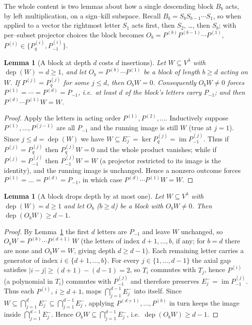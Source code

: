 \documentclass[11pt]{article}
\newtheorem{lemma}[theorem]{Lemma}
\theoremstyle{definition}
\DeclareMathOperator{\im}{im}
\DeclareMathOperator{\dep}{dep}
\newcommand{\Vlam}{V^\lambda}
\newcommand{\Em}[1]{E^{-}_{#1}}
\newcommand{\Pq}{P_{q}}
\newcommand{\Pm}{P_{-1}}
\begin{document}
The whole content is two lemmas about how a single descending block $B_b$ acts, by
left multiplication, on a sign--kill subspace. Recall $B_b=S_bS_{b-1}\cdots S_1$, so when applied
to a vector the rightmost letter $S_1$ acts first, then $S_2$, \dots, then $S_b$; with
per--subset projector choices the block becomes $O_b=P^{(b)}P^{(b-1)}\cdots P^{(1)}$,
$P^{(i)}\in\{\Pq^{(i)},\Pm^{(i)}\}$.

\begin{lemma}[A block at depth $d$ costs $d$ insertions]\label{lem:cost}
Let $W\subseteq\Vlam$ with $\dep(W)=d\ge1$, and let $O_b=P^{(b)}\cdots P^{(1)}$ be a block of
length $b\ge d$ acting on $W$. If $P^{(j)}=\Pq^{(j)}$ for some $j\le d$, then $O_bW=0$.
Consequently $O_bW\neq0$ forces $P^{(1)}=\cdots=P^{(d)}=\Pm$, i.e.\ at least $d$ of the block's
letters carry $\Pm$; and then $P^{(d)}\cdots P^{(1)}W=W$.
\end{lemma}

\begin{proof}
Apply the letters in acting order $P^{(1)},P^{(2)},\dots$. Inductively suppose
$P^{(1)},\dots,P^{(j-1)}$ are all $\Pm$ and the running image is still $W$ (true at $j=1$).
Since $j\le d=\dep(W)$ we have $W\subseteq\Em j=\ker\Pq^{(j)}=\im\Pm^{(j)}$. Thus if
$P^{(j)}=\Pq^{(j)}$ then $\Pq^{(j)}W=0$ and the whole product vanishes; while if
$P^{(j)}=\Pm^{(j)}$ then $\Pm^{(j)}W=W$ (a projector restricted to its image is the identity),
and the running image is unchanged. Hence a nonzero outcome forces $P^{(1)}=\dots=P^{(d)}=\Pm$,
in which case $P^{(d)}\cdots P^{(1)}W=W$.
\end{proof}

\begin{lemma}[A block drops depth by at most one]\label{lem:drop}
Let $W\subseteq\Vlam$ with $\dep(W)=d\ge1$ and let $O_b$ ($b\ge d$) be a block with
$O_bW\neq0$. Then $\dep(O_bW)\ge d-1$.
\end{lemma}

\begin{proof}
By Lemma~\ref{lem:cost} the first $d$ letters are $\Pm$ and leave $W$ unchanged, so
$O_bW=P^{(b)}\cdots P^{(d+1)}\,W$ (the letters of index $d+1,\dots,b$, if any; for $b=d$ there are
none and $O_bW=W$, giving depth $d\ge d-1$). Each remaining letter carries a generator of index
$i\in\{d+1,\dots,b\}$. For every $j\in\{1,\dots,d-1\}$ the axial gap satisfies
$|i-j|\ge(d+1)-(d-1)=2$, so $T_i$ commutes with $T_j$, hence $P^{(i)}$ (a polynomial in $T_i$)
commutes with $\Pm^{(j)}$ and therefore preserves $\Em j=\im\Pm^{(j)}$. Thus each $P^{(i)}$,
$i\ge d+1$, maps $\bigcap_{j=1}^{d-1}\Em j$ into itself. Since
$W\subseteq\bigcap_{j=1}^{d}\Em j\subseteq\bigcap_{j=1}^{d-1}\Em j$, applying
$P^{(d+1)},\dots,P^{(b)}$ in turn keeps the image inside $\bigcap_{j=1}^{d-1}\Em j$. Hence
$O_bW\subseteq\bigcap_{j=1}^{d-1}\Em j$, i.e.\ $\dep(O_bW)\ge d-1$.
\end{proof}
\end{document}
